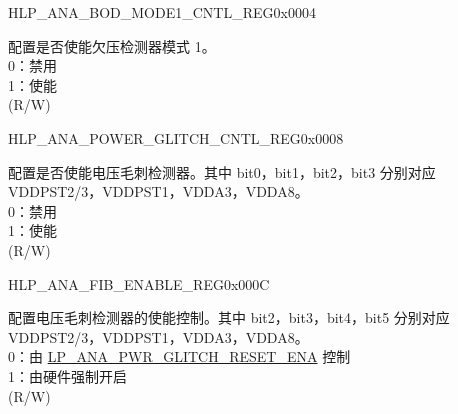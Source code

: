 \begin{register}{H}{LP\_ANA\_BOD\_MODE1\_CNTL\_REG}{0x0004}
\label{regdesc:LPANABODMODE1CNTLREG}
%
%
\regnewline%
\begin{regdesc}\begin{reglist}
\label{fielddesc:LPANABODMODE1RESETENA}\item [LP\_ANA\_BOD\_MODE1\_RESET\_ENA]  配置是否使能欠压检测器模式 1。\\
0：禁用\\
1：使能\\
(R/W)
\end{reglist}\end{regdesc}
\end{register}

\begin{register}{H}{LP\_ANA\_POWER\_GLITCH\_CNTL\_REG}{0x0008}
\label{regdesc:LPANAPOWERGLITCHCNTLREG}
%
%
\regnewline%
\begin{regdesc}\begin{reglist}
\label{fielddesc:LPANAPWRGLITCHRESETENA}\item [LP\_ANA\_PWR\_GLITCH\_RESET\_ENA]  配置是否使能电压毛刺检测器。其中 bit0，bit1，bit2，bit3 分别对应 VDDPST2/3，VDDPST1，VDDA3，VDDA8。\\
0：禁用\\
1：使能\\
(R/W)
\end{reglist}\end{regdesc}
\end{register}

\begin{register}{H}{LP\_ANA\_FIB\_ENABLE\_REG}{0x000C}\label{regdesc:LPANAFIBENABLEREG}
%
\regnewline%
\begin{regdesc}\begin{reglist}
\label{fielddesc:LPANAANAFIBENA}\item [LP\_ANA\_ANA\_FIB\_ENA] 配置电压毛刺检测器的使能控制。其中 bit2，bit3，bit4，bit5 分别对应 VDDPST2/3，VDDPST1，VDDA3，VDDA8。\\
0：由 \hyperref[fielddesc:LPANAPWRGLITCHRESETENA]{LP\_ANA\_PWR\_GLITCH\_RESET\_ENA} 控制\\
1：由硬件强制开启\\
(R/W)
\end{reglist}\end{regdesc}
\end{register}

